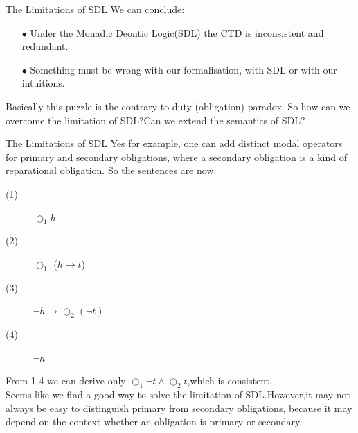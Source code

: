 \documentclass{beamer}
\begin{document}
\begin{frame}{The Limitations of SDL}
We can conclude:
\begin{enumerate}
\item[$\bullet$] Under the Monadic Deontic Logic(SDL) the CTD is inconsistent and redundant.
\item[$\bullet$] Something must be wrong with our formalisation, with SDL or with our intuitions.  
\end{enumerate}
Basically this puzzle is the contrary-to-duty (obligation) paradox.\newline\newline
So how can we overcome the limitation of SDL?Can we extend the semantics of SDL?
\end{frame}
\begin{frame}{The Limitations of SDL}
Yes for example, one can add distinct modal operators for primary and
secondary  obligations, where a secondary obligation is a kind of reparational obligation.\newline
So the sentences are now:
\begin{description}
\item[(1)] $\bigcirc_{1} h$
\item[(2)]$\bigcirc_{1}$ ($h \to t $)
\item[(3)]$\neg h \to \bigcirc_ {2} (\neg t)$
\item[(4)]$\neg h$
\end{description}
From 1-4 we can derive only $\bigcirc_{1} \neg t \wedge \bigcirc_{2} t$,which is consistent.\\
Seems like we find a good way to solve the limitation of SDL.However,it may not always be easy to distinguish primary from secondary obligations, because it may depend on the context whether an obligation is primary or secondary.
\end{frame}
\end{document}
